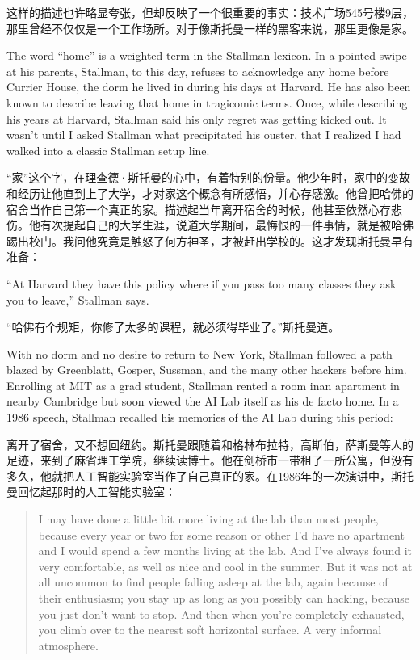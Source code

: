 \ifdefined\chs
这样的描述也许略显夸张，但却反映了一个很重要的事实：技术广场545号楼9层，那里曾经不仅仅是一个工作场所。对于像斯托曼一样的黑客来说，那里更像是家。
\fi

\ifdefined\eng
The word ``home'' is a weighted term in the Stallman lexicon. In a pointed swipe at his parents, Stallman, to this day, refuses to acknowledge any home before Currier House, the dorm he lived in during his days at Harvard. He has also been known to describe leaving that home in tragicomic terms. Once, while describing his years at Harvard, Stallman said his only regret was getting kicked out. It wasn't until I asked Stallman what precipitated his ouster, that I realized I had walked into a classic Stallman setup line.
\fi

\ifdefined\chs
``家''这个字，在理查德·斯托曼的心中，有着特别的份量。他少年时，家中的变故和经历让他直到上了大学，才对家这个概念有所感悟，并心存感激。他曾把哈佛的宿舍当作自己第一个真正的家。描述起当年离开宿舍的时候，他甚至依然心存悲伤。他有次提起自己的大学生涯，说道大学期间，最悔恨的一件事情，就是被哈佛踢出校门。我问他究竟是触怒了何方神圣，才被赶出学校的。这才发现斯托曼早有准备：
\fi

\ifdefined\eng
``At Harvard they have this policy where if you pass too many classes they ask you to leave,'' Stallman says.
\fi

\ifdefined\chs
``哈佛有个规矩，你修了太多的课程，就必须得毕业了。''斯托曼道。
\fi

\ifdefined\eng
With no dorm and no desire to return to New York, Stallman followed a path blazed by Greenblatt, Gosper, Sussman, and the many other hackers before him. Enrolling at MIT as a grad student, Stallman rented \ifdefined\vtwo a room in\fi an apartment in nearby Cambridge but soon viewed the AI Lab itself as his de facto home. In a 1986 speech, Stallman recalled his memories of the AI Lab during this period:
\fi

\ifdefined\chs
离开了宿舍，又不想回纽约。斯托曼跟随着和格林布拉特，高斯伯，萨斯曼等人的足迹，来到了麻省理工学院，继续读博士。他在剑桥市一带租了一所公寓，但没有多久，他就把人工智能实验室当作了自己真正的家。在1986年的一次演讲中，斯托曼回忆起那时的人工智能实验室：
\fi

\ifdefined\eng
\begin{quote}
I may have done a little bit more living at the lab than most people, because every year or two for some reason or other I'd have no apartment and I would spend a few months living at the lab. And I've always found it very comfortable, as well as nice and cool in the summer. But it was not at all uncommon to find people falling asleep at the lab, again because of their enthusiasm; you stay up as long as you possibly can hacking, because you just don't want to stop. And then when you're completely exhausted, you climb over to the nearest soft horizontal surface. A very informal atmosphere.
\end{quote}
\fi

